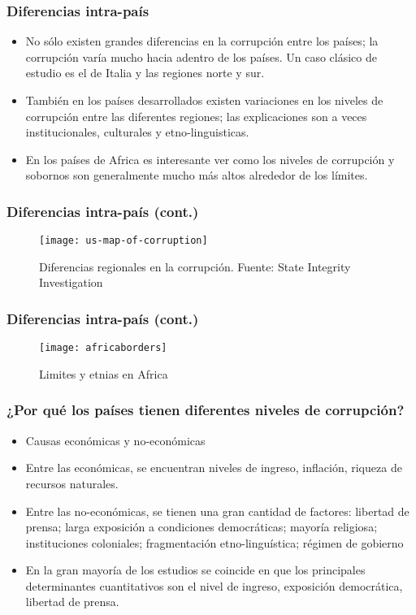 \documentclass[handout,final,xcolor=dvipsnames]{beamer}
\begin{document}
\begin{frame}\frametitle{Diferencias intra-país}
\begin{itemize}\itemsep 10pt
\item No sólo existen grandes diferencias en la corrupción entre los
  países; la corrupción varía mucho hacia adentro de los países. Un
  caso clásico de estudio es el de Italia y las regiones norte y sur. 
\item También en los países desarrollados existen variaciones en los
  niveles de corrupción entre las diferentes regiones; las
  explicaciones son a veces institucionales, culturales y
  etno-linguisticas. 
\item En los países de Africa es interesante ver como los niveles de
  corrupción y sobornos son generalmente mucho más altos alrededor de
  los límites. 
\end{itemize}

\end{frame}


\begin{frame}\frametitle{Diferencias intra-país (cont.)}
\begin{figure}[htbp]
    \centering
    \texttt{[image: us-map-of-corruption]}
    \caption{Diferencias regionales en la corrupción. Fuente: State
      Integrity Investigation}
    \label{fig:corruptregionsusa}
  \end{figure}
\end{frame}


\begin{frame}\frametitle{Diferencias intra-país (cont.)}
\begin{figure}[htbp]
    \centering
    \texttt{[image: africaborders]}
    \caption{Limites y etnias en Africa}
    \label{fig:africaborders}
  \end{figure}
\end{frame}



\begin{frame}\frametitle{¿Por qué los países tienen diferentes niveles
  de corrupción?}
\begin{itemize}\itemsep 10pt
\item Causas económicas y no-económicas
\item Entre las económicas, se encuentran niveles de ingreso,
  inflación, riqueza de recursos naturales. 
\item Entre las no-económicas, se tienen una gran cantidad de
  factores: libertad de prensa; larga exposición a condiciones
  democráticas; mayoría religiosa; instituciones
  coloniales; fragmentación etno-linguística; régimen de gobierno
\item En la gran mayoría de los estudios se coincide en que los
  principales determinantes cuantitativos son el nivel de ingreso,
  exposición democrática, libertad de prensa. 
\end{itemize}
\end{frame}
\end{document}
